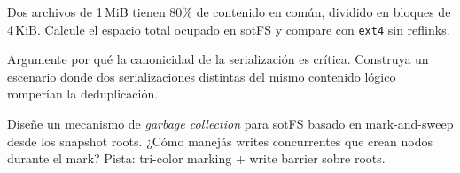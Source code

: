 \begin{ejercicio}[\dificultad{$\star\star$}]
\label{ej:hash-3}
Dos archivos de 1\,MiB tienen 80\% de contenido en común, dividido en
bloques de 4\,KiB. Calcule el espacio total ocupado en sotFS y compare
con \texttt{ext4} sin reflinks.
\end{ejercicio}

\begin{ejercicio}[\dificultad{$\star\star$}]
\label{ej:hash-4}
Argumente por qué la canonicidad de la serialización es crítica.
Construya un escenario donde dos serializaciones distintas del mismo
contenido lógico romperían la deduplicación.
\end{ejercicio}

\begin{ejercicio}[\dificultad{$\star\star$}]
\label{ej:hash-5}
Diseñe un mecanismo de \emph{garbage collection} para sotFS basado en
mark-and-sweep desde los snapshot roots. ¿Cómo manejás writes
concurrentes que crean nodos durante el mark? Pista: tri-color marking
+ write barrier sobre roots.
\end{ejercicio}
